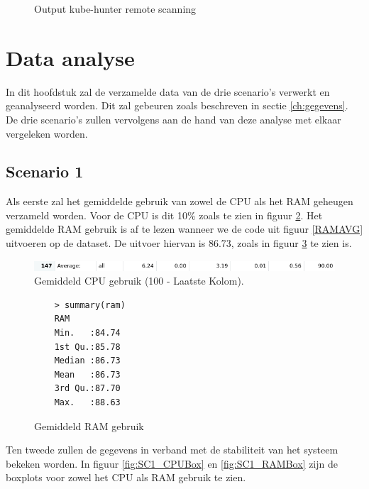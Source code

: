 \begin{figure}[h] 
	\centering
	\inputminted[fontsize=\footnotesize,linenos]{yaml}{files/hunterJob.yaml}
	\caption{Output kube-hunter remote scanning}
	\label{hunterjob}
\end{figure}

\clearpage
\section{Data analyse} 
In dit hoofdstuk zal de verzamelde data van de drie scenario's verwerkt en geanalyseerd worden. Dit zal gebeuren zoals beschreven in sectie \ref{ch:gegevens}. De drie scenario's zullen vervolgens aan de hand van deze analyse met elkaar vergeleken worden.

\subsection{Scenario 1}
Als eerste zal het gemiddelde gebruik van zowel de CPU als het RAM geheugen verzameld worden. Voor de CPU is dit 10\% zoals te zien in figuur \ref{fig:SC1_CPUAVG}. Het gemiddelde RAM gebruik is af te lezen wanneer we de code uit figuur \ref{RAMAVG} uitvoeren op de dataset. De uitvoer hiervan is 86.73, zoals in figuur \ref{SC1_RAMAVG} te zien is.
\begin{figure}[h]
	\centering
	\includegraphics[width=\linewidth]{img/SC1_CPUAVG.png}
	\caption{Gemiddeld CPU gebruik (100 - Laatste Kolom).}
	\label{fig:SC1_CPUAVG}
\end{figure}
\begin{figure}
	\centering
	\begin{verbatim} 
	> summary(ram)
	RAM       
	Min.   :84.74  
	1st Qu.:85.78  
	Median :86.73  
	Mean   :86.73  
	3rd Qu.:87.70  
	Max.   :88.63
	\end{verbatim}
	\caption{Gemiddeld RAM gebruik}
	\label{SC1_RAMAVG}
\end{figure}

Ten tweede zullen de gegevens in verband met de stabiliteit van het systeem bekeken worden. In figuur \ref{fig:SC1_CPUBox} en \ref{fig:SC1_RAMBox} zijn de boxplots voor zowel het CPU als RAM gebruik te zien. 

